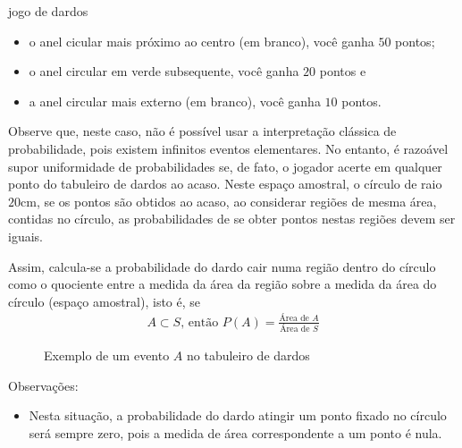 \begin{task}{jogo de dardos}
\begin{itemize}
\item {} 
o anel cicular mais próximo ao centro (em branco), você ganha $50$ pontos;

\item {} 
o anel circular em verde subsequente, você ganha $20$ pontos e

\item {} 
a anel circular mais externo (em branco), você ganha $10$ pontos.

\end{itemize}


Observe que, neste caso, não é possível usar a interpretação clássica de probabilidade, pois existem infinitos eventos elementares. No entanto, é razoável supor uniformidade de probabilidades se, de fato, o jogador acerte em qualquer ponto do tabuleiro de dardos ao acaso. Neste espaço amostral, o círculo de raio $20$cm, se os pontos são obtidos ao acaso, ao considerar regiões de mesma área, contidas no círculo, as probabilidades de se obter pontos nestas regiões devem ser iguais.

Assim, calcula-se a probabilidade do dardo cair numa região dentro do círculo como o quociente entre a medida da área da região sobre a medida da área do círculo (espaço amostral), isto é, se
\begin{equation*}
\begin{split}A\subset S \text{, então } P(A)=\displaystyle{\frac{\text{Área de }A}{\text{Área de }S}}\end{split}
\end{equation*}

\begin{figure}[H]
\centering



\caption{Exemplo de um evento \(A\) no tabuleiro de dardos}
\end{figure}

Observações:
\begin{itemize}
\item {} 
Nesta situação, a probabilidade do dardo atingir um ponto fixado no círculo será sempre zero, pois a medida de área correspondente a um ponto é nula.


\end{itemize}
\end{task}
